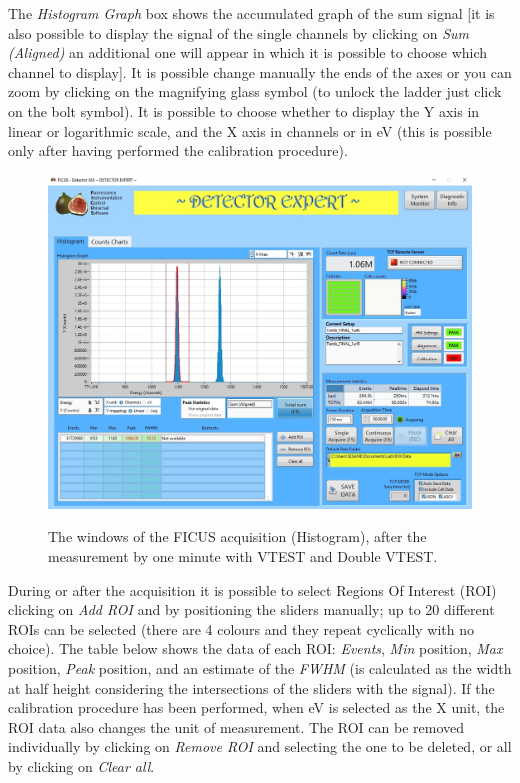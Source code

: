 \documentclass[a4paper,12pt,oneside,pdflatex,italian,final,twocolumn]{article}
\begin{document}
The \textit{Histogram Graph} box shows the accumulated graph of the sum signal [it is also possible to display the signal of the single channels by clicking on \textit{Sum (Aligned)} an additional one will appear in which it is possible to choose which channel to display]. It is possible change manually the ends of the axes or you can zoom by clicking on the magnifying glass symbol (to unlock the ladder just click on the bolt symbol).
It is possible to choose whether to display the Y axis in linear or logarithmic scale, and the X axis in channels or in eV (this is possible only after having performed the calibration procedure).

\begin{figure}[h!]
\centering
{\includegraphics[width=.95\textwidth]{Capture31.jpg}} \quad
\caption{The windows of the FICUS acquisition (Histogram), after the measurement by one minute with VTEST and Double VTEST.}\label{fig:fig24}
\end{figure}

During or after the acquisition it is possible to select Regions Of Interest (ROI) clicking on \textit{Add ROI} and by positioning the sliders manually; up to 20 different ROIs can be selected (there are 4 colours and they repeat cyclically with no choice). 
The table below shows the data of each ROI: \textit{Events}, \textit{Min} position, \textit{Max} position, \textit{Peak} position, and an estimate of the \textit{FWHM} (is calculated as the width at half height considering the intersections of the sliders with the signal). 
If the calibration procedure has been performed, when eV is selected as the X unit, the ROI data also changes the unit of measurement.
The ROI can be removed individually by clicking on \textit{Remove ROI} and selecting the one to be deleted, or all by clicking on \textit{Clear all}.
\end{document}
